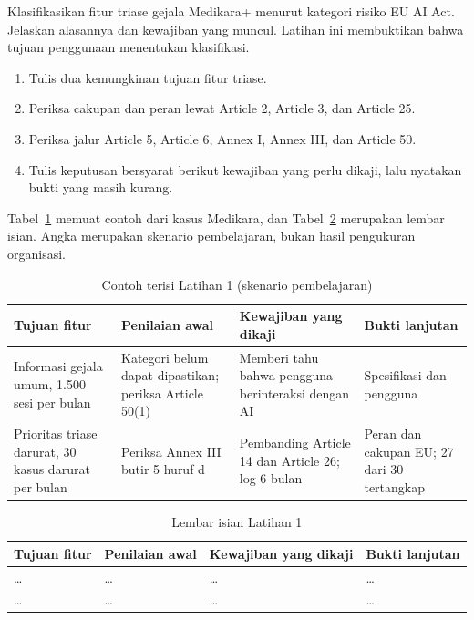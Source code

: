 Klasifikasikan fitur triase gejala Medikara+ menurut kategori risiko EU AI Act. Jelaskan alasannya
dan kewajiban yang muncul. Latihan ini membuktikan bahwa tujuan penggunaan menentukan klasifikasi.

\begin{enumerate}
  \item Tulis dua kemungkinan tujuan fitur triase.
  \item Periksa cakupan dan peran lewat Article 2, Article 3, dan Article 25.
  \item Periksa jalur Article 5, Article 6, Annex I, Annex III, dan Article 50.
  \item Tulis keputusan bersyarat berikut kewajiban yang perlu dikaji, lalu nyatakan bukti yang
  masih kurang.
\end{enumerate}

Tabel~\ref{tab:ch11-lat1-contoh} memuat contoh dari kasus Medikara, dan
Tabel~\ref{tab:ch11-lat1-hasil} merupakan lembar isian. Angka merupakan skenario pembelajaran, bukan
hasil pengukuran organisasi.

\begin{table}[!htb]
  \centering\small
  \caption{Contoh terisi Latihan 1 (skenario pembelajaran)}\label{tab:ch11-lat1-contoh}
  \begin{tabularx}{\textwidth}{|>{\raggedright\arraybackslash}X|>{\raggedright\arraybackslash}X|>{\raggedright\arraybackslash}X|>{\raggedright\arraybackslash}X|}
    \hline
    \textbf{Tujuan fitur} & \textbf{Penilaian awal} & \textbf{Kewajiban yang dikaji} & \textbf{Bukti
    lanjutan} \\ \hline
    Informasi gejala umum, 1.500 sesi per bulan & Kategori belum dapat dipastikan; periksa Article
    50(1) & Memberi tahu bahwa pengguna berinteraksi dengan AI & Spesifikasi dan pengguna \\ \hline
    Prioritas triase darurat, 30 kasus darurat per bulan & Periksa Annex III butir 5 huruf d &
    Pembanding Article 14 dan Article 26; log 6 bulan & Peran dan cakupan EU; 27 dari 30 tertangkap
    \\ \hline
  \end{tabularx}
\end{table}

\begin{table}[!htb]
  \centering\small
  \caption{Lembar isian Latihan 1}\label{tab:ch11-lat1-hasil}
  \begin{tabularx}{\textwidth}{|>{\raggedright\arraybackslash}X|>{\raggedright\arraybackslash}X|>{\raggedright\arraybackslash}X|>{\raggedright\arraybackslash}X|}
    \hline
    \textbf{Tujuan fitur} & \textbf{Penilaian awal} & \textbf{Kewajiban yang dikaji} & \textbf{Bukti
    lanjutan} \\ \hline
    \dots & \dots & \dots & \dots \\ \hline
    \dots & \dots & \dots & \dots \\ \hline
  \end{tabularx}
\end{table}


